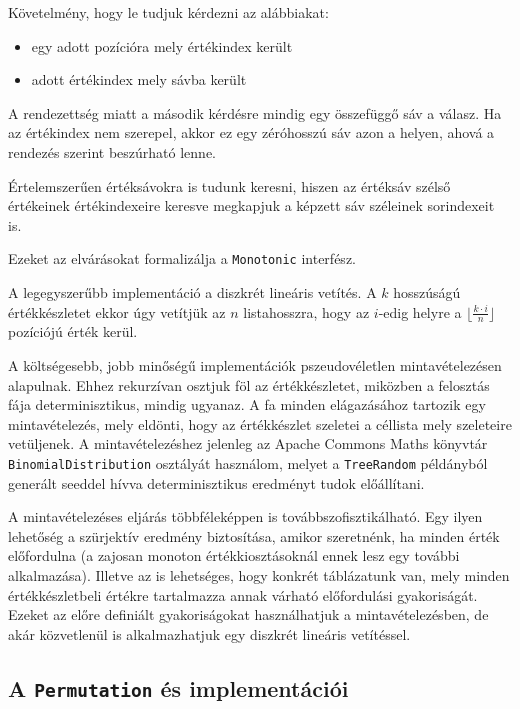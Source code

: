 \documentclass[
    parspace,
    noindent,
    nohyp,
]{elteiktdk}[2023/04/10]
\begin{document}
Követelmény, hogy le tudjuk kérdezni az alábbiakat:

\begin{itemize}
    \item egy adott pozícióra mely értékindex került
    \item adott értékindex mely sávba került
\end{itemize}

A rendezettség miatt a második kérdésre mindig egy összefüggő sáv a válasz. Ha az értékindex nem szerepel, akkor ez egy zéróhosszú sáv azon a helyen, ahová a rendezés szerint beszúrható lenne.

Értelemszerűen értéksávokra is tudunk keresni, hiszen az értéksáv szélső értékeinek értékindexeire keresve megkapjuk a képzett sáv széleinek sorindexeit is.

Ezeket az elvárásokat formalizálja a \texttt{Monotonic} interfész.

A legegyszerűbb implementáció a diszkrét lineáris vetítés.
A $k$ hosszúságú értékkészletet ekkor úgy vetítjük az $n$ listahosszra,
hogy az $i$-edig helyre a $\lfloor \frac{k \cdot i}{n} \rfloor$ pozíciójú érték kerül.

A költségesebb, jobb minőségű implementációk pszeudovéletlen mintavételezésen alapulnak.
Ehhez rekurzívan osztjuk föl az értékkészletet, miközben a felosztás fája determinisztikus, mindig ugyanaz.
A fa minden elágazásához tartozik egy mintavételezés, mely eldönti,
hogy az értékkészlet szeletei a céllista mely szeleteire vetüljenek.
A mintavételezéshez jelenleg az Apache Commons Maths könyvtár
\texttt{BinomialDistribution} osztályát használom,
melyet a \texttt{TreeRandom} példányból generált seeddel hívva
determinisztikus eredményt tudok előállítani.

A mintavételezéses eljárás többféleképpen is továbbszofisztikálható.
Egy ilyen lehetőség a szürjektív eredmény biztosítása, amikor szeretnénk, ha minden érték előfordulna
(a zajosan monoton értékkiosztásoknál ennek lesz egy további alkalmazása).
Illetve az is lehetséges, hogy konkrét táblázatunk van,
mely minden értékkészletbeli értékre tartalmazza annak várható előfordulási gyakoriságát.
Ezeket az előre definiált gyakoriságokat használhatjuk a mintavételezésben,
de akár közvetlenül is alkalmazhatjuk egy diszkrét lineáris vetítéssel.

\subsection{A \texttt{Permutation} és implementációi}
\end{document}
